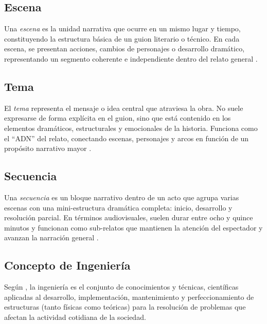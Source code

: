\documentclass[12pt]{article}
\begin{document}
	\subsection{Escena}

	\hspace{1.27cm}Una \textit{escena} es la unidad narrativa que ocurre en un mismo lugar y tiempo, constituyendo la estructura básica de un guion literario o técnico. En cada escena, se presentan acciones, cambios de personajes o desarrollo dramático, representando un segmento coherente e independiente dentro del relato general \parencite{trottier_scene}.

	\subsection{Tema}

	\hspace{1.27cm}El \textit{tema} representa el mensaje o idea central que atraviesa la obra. No suele expresarse de forma explícita en el guion, sino que está contenido en los elementos dramáticos, estructurales y emocionales de la historia. Funciona como el “ADN” del relato, conectando escenas, personajes y arcos en función de un propósito narrativo mayor \parencite{greenlight_theme,writingninja_theme}.

	\subsection{Secuencia}

	\hspace{1.27cm}Una \textit{secuencia} es un bloque narrativo dentro de un acto que agrupa varias escenas con una mini-estructura dramática completa: inicio, desarrollo y resolución parcial. En términos audiovisuales, suelen durar entre ocho y quince minutos y funcionan como sub-relatos que mantienen la atención del espectador y avanzan la narración general \parencite{gulino_sequence,cambridge_sequence}.

	\subsection{Concepto de Ingeniería}

	\hspace{1.27cm}Según \textcite{maida_metodologias_2015}, la ingeniería es el conjunto de conocimientos y técnicas, científicas aplicadas al desarrollo,
	implementación, mantenimiento y perfeccionamiento de estructuras (tanto físicas como teóricas)
	para la resolución de problemas que afectan la actividad cotidiana de la sociedad.
\end{document}
